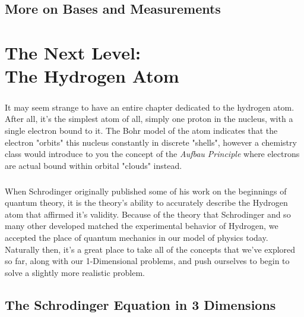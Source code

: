 \documentclass[12pt,letterpaper]{book}
\begin{document}

\section{More on Bases and Measurements}



\chapter{The Next Level: \\ The Hydrogen Atom}
\paragraph*{}It may seem strange to have an entire chapter dedicated to the hydrogen atom. After all, it's the simplest atom of all, simply one proton in the nucleus, with a single electron bound to it.  The Bohr model of the atom indicates that the electron "orbits" this nucleus constantly in discrete "shells", however a chemistry class would introduce to you the concept of the \textit{Aufbau Principle} where electrons are actual bound within orbital "clouds" instead.
\paragraph*{}When Schrodinger originally published some of his work on the beginnings of quantum theory, it is the theory's ability to accurately describe the Hydrogen atom that affirmed it's validity. Because of the theory that Schrodinger and so many other developed matched the experimental behavior of Hydrogen, we accepted the place of quantum mechanics in our model of physics today. Naturally then, it's a great place to take all of the concepts that we've explored so far, along with our 1-Dimensional problems, and push ourselves to begin to solve a slightly more realistic problem. 


\section{The Schrodinger Equation in 3 Dimensions}
\end{document}
